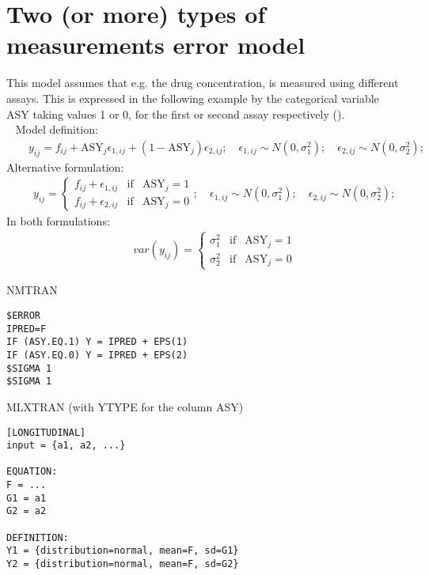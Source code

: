 \section{Two (or more) types of measurements error model}
\label{model8}
This model assumes that e.g. the drug concentration, is measured using  different assays. 
This is expressed in the following example by the categorical variable ASY taking values 
1 or 0, for the first or second assay respectively (\cite{NONMEM:2006aa}).  \\\	
\bigskip
Model definition:
\begin{eqnarray}
&& y_{ij} = f_{ij} + \text{ASY}_j\epsilon_{1,ij} + (1-\text{ASY}_j) \epsilon_{2,ij}; \quad \epsilon_{1,ij} \sim N(0,\sigma_1^2); \quad \epsilon_{2,ij} \sim N(0,\sigma_2^2); \nonumber
\end{eqnarray}
Alternative formulation:
\begin{eqnarray}
&& y_{ij} = \left\{ \begin{array}{rcl}  f_{ij} + \epsilon_{1,ij}  & \mbox{if} & \text{ASY}_j  = 1 \\
f_{ij} + \epsilon_{2,ij}  & \mbox{if} & \text{ASY}_j  = 0 \nonumber
\end{array}\right.;  \quad \epsilon_{1,ij} \sim N(0,\sigma_1^2); \quad \epsilon_{2,ij} \sim N(0,\sigma_2^2); 
\end{eqnarray}
In both formulations:
\begin{eqnarray}
&& \mathit{var}(y_{ij}) = \left\{ \begin{array}{rcl}  \sigma_{1}^2  & \mbox{if} & \text{ASY}_j  = 1 \\
\sigma_{2}^2  & \mbox{if} & \text{ASY}_j  = 0 \nonumber
\end{array}\right.
\end{eqnarray}

\bigskip
\begin{lrbox}{\lstbox}\begin{minipage}{16cm}
NMTRAN
\begin{lstlisting}[frame=single,language=NM]
$ERROR
IPRED=F
IF (ASY.EQ.1) Y = IPRED + EPS(1)
IF (ASY.EQ.0) Y = IPRED + EPS(2)
$SIGMA 1
$SIGMA 1
\end{lstlisting}   
\end{minipage}\end{lrbox}
\usebox\lstbox


\begin{lrbox}{\lstbox}\begin{minipage}{16cm}
MLXTRAN (with YTYPE for the column ASY)
\begin{lstlisting}[frame=single,language=MLX]
[LONGITUDINAL]
input = {a1, a2, ...}

EQUATION:
F = ... 
G1 = a1
G2 = a2

DEFINITION:
Y1 = {distribution=normal, mean=F, sd=G1}
Y2 = {distribution=normal, mean=F, sd=G2}
\end{lstlisting}   
\end{minipage}\end{lrbox}
\usebox\lstbox


